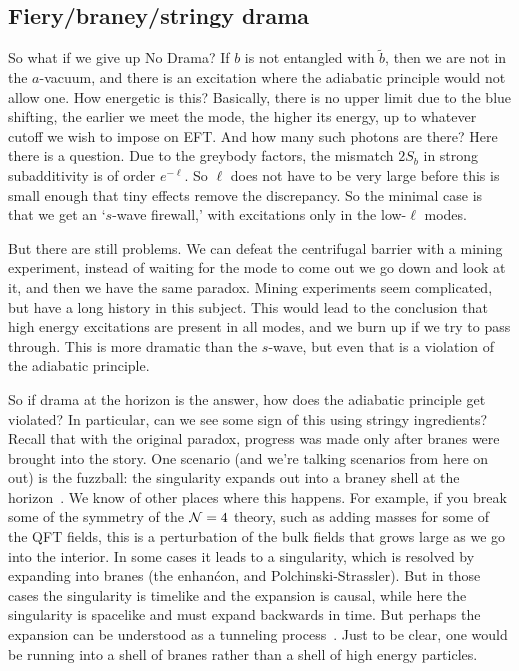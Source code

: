 \documentclass[12pt]{article}
\begin{document}
\subsection{Fiery/braney/stringy drama}


So what if we give up No Drama?  If $b$ is not entangled with $\tilde b$, then we are not in the $a$-vacuum, and there is an excitation where the adiabatic principle would not allow one.  How energetic is this?  Basically, there is no upper limit due to the blue shifting, the earlier we meet the mode, the higher its energy, up to whatever cutoff we wish to impose on EFT.  And how many such photons are there?  Here there is a question.  Due to the greybody factors, the mismatch $2 S_b$ in strong subadditivity is of order $e^{-\ell}$.  So $\ell$ does not have to be very large before this is small enough that tiny effects remove the discrepancy.  So the minimal case is that we get an `$s$-wave firewall,' with excitations only in the low-$\ell$ modes.  

But there are still problems.  We can defeat the centrifugal barrier with a mining experiment, instead of waiting for the mode to come out we go down and look at it, and then we have the same paradox.  Mining experiments seem complicated, but have a long history in this subject.  This would lead to the conclusion that high energy excitations are present in all modes, and we burn up if we try to pass through.  This is more dramatic than the $s$-wave, but even that is a violation of the adiabatic principle.

So if drama at the horizon is the answer, how does the adiabatic principle get violated?  In particular, can we see some sign of this using stringy ingredients? Recall that with the original paradox, progress was made only after branes were brought into the story.  One scenario (and we're talking scenarios from here on out) is the fuzzball:  the singularity expands out into a braney shell at the horizon~\cite{Mathur:2009hf}.  We know of other places where this happens.  For example, if you break some of the symmetry of the ${\cal N}=4$ theory, such as adding masses for some of the QFT fields, this is a perturbation of the bulk fields that grows large as we go into the interior.  In some cases it leads to a singularity, which is resolved by expanding into branes (the enhan\'con, and Polchinski-Strassler).  But in those cases the singularity is timelike and the expansion is causal, while here the singularity is spacelike and must expand backwards in time.  But perhaps the expansion can be understood as a tunneling process~\cite{Kraus:2015zda,Mathur:2015nra}.  Just to be clear, one would be running into a shell of branes rather than a shell of high energy particles.
\end{document}
